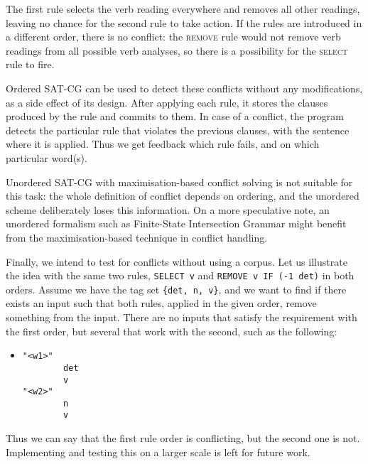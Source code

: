 The first rule selects the verb reading everywhere and removes
all other readings, leaving no chance for the second rule to take action.
If the rules are introduced in a different order, there is no
conflict: the \textsc{remove} rule would not remove verb readings from all
possible verb analyses, so there is a possibility for the \textsc{select} rule
to fire.


Ordered SAT-CG can be used to detect these conflicts without any
modifications, as a side effect of its design. 
After applying each rule, it stores the clauses
produced by the rule and commits to them.
In case of a conflict, the program detects the particular rule that 
violates the previous clauses, with the sentence
where it is applied. Thus we get feedback which rule fails, and on which
particular word(s).


Unordered SAT-CG with maximisation-based conflict solving is not
suitable for this task: the whole definition of conflict depends on
ordering, and the unordered scheme deliberately loses this information.
On a more speculative note, an unordered formalism such as Finite-State
Intersection Grammar \cite{koskenniemi90} might benefit from the
maximisation-based technique in conflict handling.

Finally, we intend to test for conflicts
without using a corpus.
Let us illustrate the idea with the same two rules,
\texttt{SELECT v} and \texttt{REMOVE v IF (-1 det)}
in both orders.
Assume we have the tag set \texttt{\{det, n, v\}}, 
and we want to find if there exists an input such that
 both rules, applied in the given order, remove something from the input.
There are no inputs that satisfy the requirement with the first order,
but several that work with the second, such as the following:

\begin{itemize}
\item []
\begin{verbatim}
"<w1>"
        det
        v
"<w2>"
        n
        v
\end{verbatim}
\end{itemize}
Thus we can say that the first rule order is conflicting, but the second
one is not. 
Implementing and testing this on a larger scale is left for future work.


